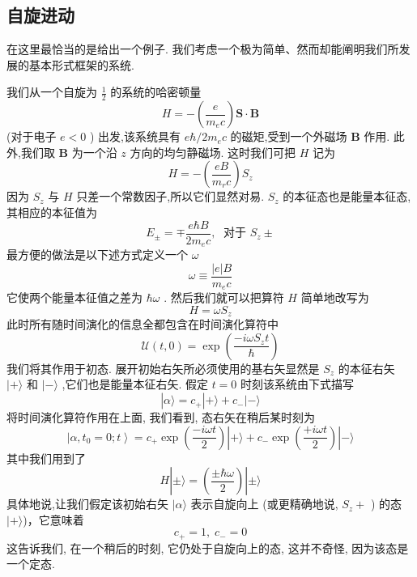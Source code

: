 \documentclass[lang=cn,newtx,10pt,scheme=chinese,thmcnt=section]{elegantbook}
\begin{document}
\subsection*{自旋进动}
在这里最恰当的是给出一个例子. 我们考虑一个极为简单、然而却能阐明我们所发展的基本形式框架的系统.

我们从一个自旋为 $\frac{1}{2}$ 的系统的哈密顿量
\begin{equation}
	H = - \left( \frac{e}{{m}_{e}c}\right) \mathbf{S} \cdot \mathbf{B}
\end{equation}
(对于电子 $e < 0$ ) 出发,该系统具有 $e\hbar /2{m}_{e}c$ 的磁矩,受到一个外磁场 $\mathbf{B}$ 作用. 此外,我们取 $\mathbf{B}$ 为一个沿 $z$ 方向的均匀静磁场. 这时我们可把 $H$ 记为
\begin{equation}
	H = - \left( \frac{eB}{{m}_{r}c}\right) {S}_{z}
\end{equation}
因为 ${S}_{z}$ 与 $H$ 只差一个常数因子,所以它们显然对易. ${S}_{z}$ 的本征态也是能量本征态,其相应的本征值为
\begin{equation}
	{E}_{ \pm } = \mp \frac{e\hbar B}{2{m}_{e}c},\;\text{ 对于 }{S}_{z} \pm
\end{equation}
最方便的做法是以下述方式定义一个 $\omega$
\begin{equation}
	\omega \equiv \frac{\left| e\right| B}{{m}_{e}c}
\end{equation}
它使两个能量本征值之差为 $\hbar \omega$ . 然后我们就可以把算符 $H$ 简单地改写为
\begin{equation}
	H = \omega {S}_{z}
\end{equation}
此时所有随时间演化的信息全都包含在时间演化算符中
\begin{equation}
	\mathcal{U}\left( {t,0}\right) = \exp \left( \frac{-{i\omega }{S}_{z}t}{\hbar }\right)
\end{equation}
我们将其作用于初态. 展开初始右矢所必须使用的基右矢显然是 ${S}_{z}$ 的本征右矢 $| + \rangle$ 和 $| - \rangle$ ,它们也是能量本征右矢. 假定 $t = 0$ 时刻该系统由下式描写
\begin{equation}
	\left| {\alpha \rangle = {c}_{ + }}\right| + \rangle + {c}_{ - }| - \rangle
\end{equation}
将时间演化算符作用在上面, 我们看到, 态右矢在稍后某时刻为
\begin{equation}
	\left| {\alpha ,{t}_{0} = 0;t}\right\rangle = {c}_{ + }\exp \left( \frac{-{i\omega t}}{2}\right) | {+\rangle + {c}_{ - }\exp \left( \frac{+{i\omega t}}{2}\right) }| - \rangle
\end{equation}
其中我们用到了
\begin{equation}
	H| {\pm \rangle = \left( \frac{\pm \hbar \omega }{2}\right) }| \pm \rangle
\end{equation}
具体地说,让我们假定该初始右矢 $|\alpha \rangle$ 表示自旋向上 (或更精确地说, ${S}_{z} +$ ) 的态$|+\rangle$)，它意味着
\begin{equation}
	{c}_{ + } = 1,\;{c}_{ - } = 0
\end{equation}
这告诉我们, 在一个稍后的时刻, 它仍处于自旋向上的态, 这并不奇怪, 因为该态是一个定态.
\end{document}
